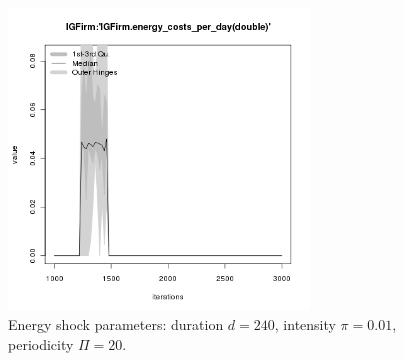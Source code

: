 \begin{figure}[ht!]
\begin{minipage}{17cm}
\includegraphics[width=8cm]{./energy_shock/png/duration_240/intensity_0.01/frequency_20/IGFirm-energy_costs_per_day.png}
\end{minipage}
\caption{Energy shock parameters: duration $d=240$, intensity $\pi=0.01$, periodicity $\Pi=20$.}
\label{Figure: energy shock 3}
\end{figure}

